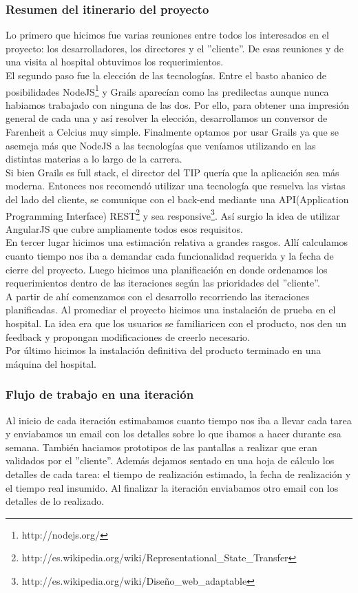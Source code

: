 \subsubsection{Resumen del itinerario del proyecto}
Lo primero que hicimos fue varias reuniones entre todos los interesados en el proyecto: los desarrolladores, los directores y el ''cliente''. De esas reuniones y de una visita al hospital obtuvimos los requerimientos.\\
El segundo paso fue la elección de las tecnologías. Entre el basto abanico de posibilidades NodeJS\footnote{http://nodejs.org/} y Grails aparecían como las predilectas aunque nunca habiamos trabajado con ninguna de las dos. Por ello, para obtener una impresión general de cada una y así resolver la elección, desarrollamos un conversor de Farenheit a Celcius muy simple. Finalmente optamos por usar Grails ya que se asemeja más que NodeJS a las tecnologías que veníamos utilizando en las distintas materias a lo largo de la carrera.\\
Si bien Grails es full stack, el director del TIP quería que la aplicación sea más moderna. Entonces nos recomendó utilizar una tecnología que resuelva las vistas del lado del cliente, se comunique con el back-end mediante una API(Application Programming Interface) REST\footnote{http://es.wikipedia.org/wiki/Representational\_State\_Transfer} 
y sea responsive\footnote{http://es.wikipedia.org/wiki/Diseño\_web\_adaptable}. Así surgio la idea de utilizar AngularJS que cubre ampliamente todos esos requisitos.\\
En tercer lugar hicimos una estimación relativa a grandes rasgos. Allí calculamos cuanto tiempo nos iba a demandar cada funcionalidad requerida y la fecha de cierre del proyecto. Luego hicimos una planificación en donde ordenamos los requerimientos dentro de las iteraciones según las prioridades del ''cliente''.\\
A partir de ahí comenzamos con el desarrollo recorriendo las iteraciones planificadas. Al promediar el proyecto hicimos una instalación de prueba en el hospital. La idea era que los usuarios se familiaricen con el producto, nos den un feedback y propongan modificaciones de creerlo necesario.\\
Por último hicimos la instalación definitiva del producto terminado en una máquina del hospital.
\subsubsection{Flujo de trabajo en una iteración}
Al inicio de cada iteración estimabamos cuanto tiempo nos iba a llevar cada tarea y enviabamos un email con los detalles sobre lo que ibamos a hacer durante esa semana. También haciamos prototipos de las pantallas a realizar que eran validados por el ''cliente''. Además dejamos sentado en una hoja de cálculo los detalles de cada tarea: el tiempo de realización estimado, la fecha de realización y el tiempo real insumido. Al finalizar la iteración enviabamos otro email con los detalles de lo realizado.

